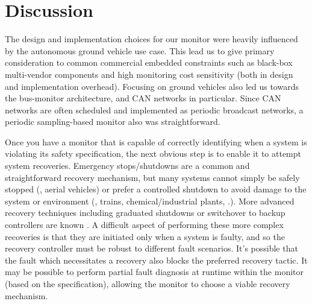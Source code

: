 
\section{Discussion}

The design and implementation choices for our monitor were heavily influenced by the autonomous ground vehicle use case. This lead us to give primary consideration to common commercial embedded constraints such as black-box multi-vendor components and high monitoring cost sensitivity (both in design and implementation overhead).
%
Focusing on ground vehicles also led us towards the bus-monitor architecture, and CAN networks in particular. Since CAN networks are often scheduled and implemented as periodic broadcast networks, a periodic sampling-based monitor also was straightforward.

Once you have a monitor that is capable of correctly identifying when a system is violating its safety specification, the next obvious step is to enable it to attempt system recoveries.
%
Emergency stops/shutdowns are a common and straightforward recovery mechanism, but many systems cannot simply be safely stopped (\eg, aerial vehicles) or prefer a controlled shutdown to avoid damage to the system or environment (\eg, trains, chemical/industrial plants, \etc.).
More advanced recovery techniques including graduated shutdowns or switchover to backup controllers are known \cite{}. 
A difficult aspect of performing these more complex recoveries is that they are initiated only when a system is faulty, and so the recovery controller must be robust to different fault scenarios.
%
It’s possible that the fault which necessitates a recovery also blocks the preferred recovery tactic. 
It may be possible to perform partial fault diagnosis at runtime within the monitor (based on the specification), allowing the monitor to choose a viable recovery mechanism. 

